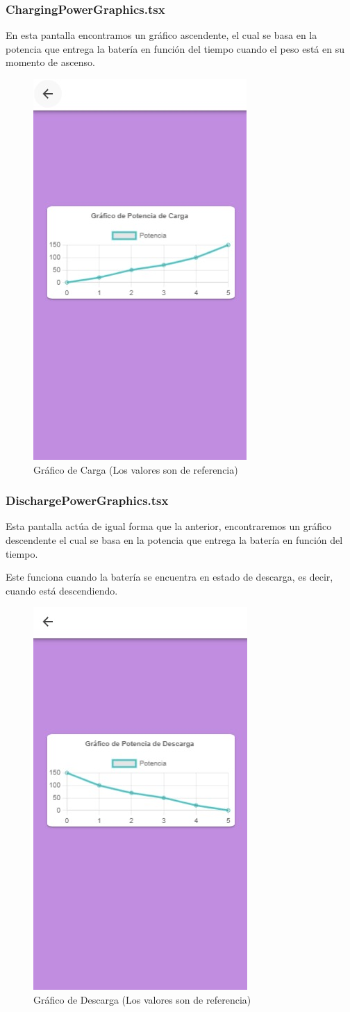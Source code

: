                 \subsubsection{ChargingPowerGraphics.tsx}
                    En esta pantalla encontramos un gráfico ascendente, el cual se basa en la potencia que entrega la batería en función del tiempo cuando el peso está en su momento de ascenso.\par
    
                    \begin{figure} [H]
                        \centering
                        \includegraphics[width=0.25\linewidth]{Imagenes/Aplicación/Graphics_Charge.jpg}
                        \caption{Gráfico de Carga (Los valores son de referencia)}
                        \label{fig:a9}
                    \end{figure}

                \subsubsection{DischargePowerGraphics.tsx}
                    Esta pantalla actúa de igual forma que la anterior, encontraremos un gráfico descendente el cual se basa en la potencia que entrega la batería en función del tiempo.\par
                    Este funciona cuando la batería se encuentra en estado de descarga, es decir, cuando está descendiendo.\par
    
                    \begin{figure} [H]
                        \centering
                        \includegraphics[width=0.25\linewidth]{Imagenes/Aplicación/Graphics_Discharge.jpg}
                        \caption{Gráfico de Descarga (Los valores son de referencia)}
                        \label{fig:a10}
                    \end{figure}

